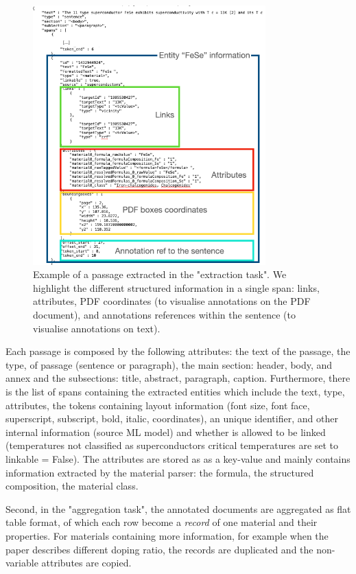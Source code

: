 \documentclass{article}
\begin{document}
\begin{figure}[t]
  \centering
  \includegraphics[width=0.8\textwidth]{images/data-flow-2} 
  \caption{Example of a passage extracted in the "extraction task". We highlight the different structured information in a single span: links, attributes, PDF coordinates (to visualise annotations on the PDF document), and annotations references within the sentence (to visualise annotations on text).}
  \label{fig:data-flow-2}
\end{figure}

Each passage is composed by the following attributes: the text of the passage, the type, of passage (sentence or paragraph), the main section: header, body, and annex and the subsections: title, abstract, paragraph, caption. 
Furthermore, there is the list of spans containing the extracted entities which include the text, type, attributes, the tokens containing layout information (font size, font face, superscript, subscript, bold, italic, coordinates), an unique identifier, and other internal information (source ML model) and whether is allowed to be linked (temperatures not classified as superconductors critical temperatures are set to linkable = False).
The attributes are stored as as a key-value and mainly contains information extracted by the material parser: the formula, the structured composition, the material class.  

Second, in the "aggregation task", the annotated documents are aggregated as flat table format, of which each row become a \textit{record} of one material and their properties. For materials containing more information, for example when the paper describes different doping ratio, the records are duplicated and the non-variable attributes are copied. 
\end{document}
